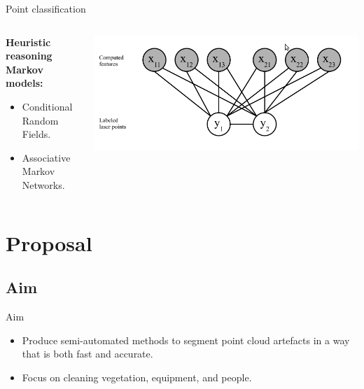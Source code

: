 \documentclass{beamer}
\begin{document}
\begin{frame}{Point classification}

\begin{columns}[T]
\begin{column}{0.5\textwidth}

\textbf{Heuristic reasoning}\\
\textbf{Markov models:}
\begin{itemize}
\item Conditional Random Fields.
\item Associative Markov Networks.
\end{itemize}


\end{column}

\begin{column}{0.5\textwidth}
\includegraphics[width=1\textwidth]{pics/crf.png}


\end{column}

\end{columns}


\end{frame}

\section{Proposal}

\subsection{Aim}

\begin{frame}{Aim}
\begin{itemize}

\item
Produce semi-automated methods to segment point cloud artefacts in a way that is both fast and accurate.

\item
Focus on cleaning vegetation, equipment, and people.
\end{itemize}


\end{frame}
\end{document}
